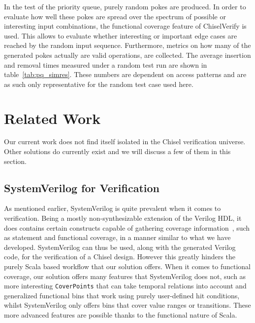 \documentclass[conference]{IEEEtran}
\begin{document}
In the test of the priority queue, purely random pokes are produced. In order to evaluate how well these pokes are spread over the spectrum 
of possible or interesting input combinations, the functional coverage feature of ChiselVerify is used. This allows to evaluate whether interesting 
or important edge cases are reached by the random input sequence. Furthermore, metrics on how many of the generated pokes actually are valid 
operations, are collected. The average insertion and removal times measured under a random test run are shown in table~\ref{tab:pq_simres}.
These numbers are dependent on access patterns and are as such only representative for the random test case used here.

\section{Related Work}
Our current work does not find itself isolated in the Chisel verification universe. Other solutions do currently exist and we will discuss a few of them in this section.  

\subsection{SystemVerilog for Verification}
As mentioned earlier, SystemVerilog is quite prevalent when it comes to verification. Being a mostly non-synthesizable extension of the Verilog HDL, it does contains certain constructs capable of gathering coverage information~\cite{spear2008systemverilog}, such as statement and functional coverage, in a manner similar to what we have developed. SystemVerilog can thus be used, along with the generated Verilog code, for the verification of a Chisel design. However this greatly hinders the purely Scala based workflow that our solution offers. When it comes to functional coverage, our solution offers many features that SystemVerilog does not, such as more interesting \texttt{CoverPoints} that can take temporal relations into account and generalized functional bins that work using purely user-defined hit conditions, whilst SystemVerilog only offers bins that cover value ranges or transitions. These more advanced features are possible thanks to the functional nature of Scala. 
\end{document}
